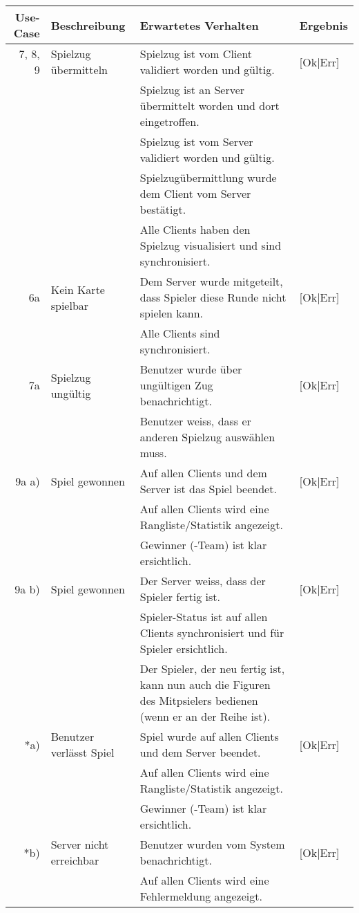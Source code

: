 \documentclass[a4paper,12pt,halfparskip,DIV14]{scrartcl}
\begin{document}
\newpage

\begin {tabular}{r | p{3cm} | p{8cm} | l}
\hline \hline
\textbf{Use-Case} & \textbf{Beschreibung} & \textbf{Erwartetes Verhalten} & \textbf{Ergebnis} \\
\hline
7, 8, 9 & Spielzug übermitteln & Spielzug ist vom Client validiert worden und gültig. & [Ok|Err] \\
 \cline{3-4} & & Spielzug ist an Server übermittelt worden und dort eingetroffen. & \\
 \cline{3-4} & & Spielzug ist vom Server validiert worden und gültig. & \\
 \cline{3-4} & & Spielzugübermittlung wurde dem Client vom Server bestätigt. & \\
 \cline{3-4} & & Alle Clients haben den Spielzug visualisiert und sind synchronisiert. & \\
\hline
6a & Kein Karte spielbar & Dem Server wurde mitgeteilt, dass Spieler diese Runde nicht spielen kann. & [Ok|Err] \\
 \cline{3-4} & & Alle Clients sind synchronisiert. & \\
\hline
7a & Spielzug ungültig & Benutzer wurde über ungültigen Zug benachrichtigt. & [Ok|Err] \\
 \cline{3-4} & & Benutzer weiss, dass er anderen Spielzug auswählen muss. & \\
\hline
9a a) & Spiel gewonnen & Auf allen Clients und dem Server ist das Spiel beendet. & [Ok|Err] \\
 \cline{3-4} & & Auf allen Clients wird eine Rangliste/Statistik angezeigt. & \\
 \cline{3-4} & & Gewinner (-Team) ist klar ersichtlich. & \\
\hline
9a b) & Spiel gewonnen & Der Server weiss, dass der Spieler fertig ist. & [Ok|Err] \\
 \cline{3-4} & & Spieler-Status ist auf allen Clients synchronisiert und für Spieler ersichtlich. & \\
 \cline{3-4} & & Der Spieler, der neu fertig ist, kann nun auch die Figuren des Mitpsielers bedienen (wenn er an der Reihe ist). & \\
\hline
*a) & Benutzer verlässt Spiel & Spiel wurde auf allen Clients und dem Server beendet. & [Ok|Err] \\
 \cline{3-4} & & Auf allen Clients wird eine Rangliste/Statistik angezeigt. & \\
 \cline{3-4} & & Gewinner (-Team) ist klar ersichtlich. & \\
\hline
*b) & Server nicht erreichbar & Benutzer wurden vom System benachrichtigt. & [Ok|Err] \\
 \cline{3-4} & & Auf allen Clients wird eine Fehlermeldung angezeigt. & \\
\hline
\end{tabular}
\end{document}
